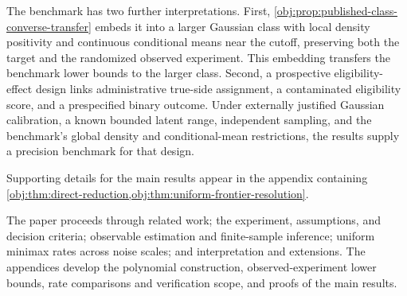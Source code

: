 The benchmark has two further interpretations. First, \cref{obj:prop:published-class-converse-transfer} embeds it into a larger Gaussian class with local density positivity and continuous conditional means near the cutoff, preserving both the target and the randomized observed experiment. This embedding transfers the benchmark lower bounds to the larger class. Second, a prospective eligibility-effect design links administrative true-side assignment, a contaminated eligibility score, and a prespecified binary outcome. Under externally justified Gaussian calibration, a known bounded latent range, independent sampling, and the benchmark's global density and conditional-mean restrictions, the results supply a precision benchmark for that design.

Supporting details for the main results appear in the appendix containing \cref{obj:thm:direct-reduction,obj:thm:uniform-frontier-resolution}.

The paper proceeds through related work; the experiment, assumptions, and decision criteria; observable estimation and finite-sample inference; uniform minimax rates across noise scales; and interpretation and extensions. The appendices develop the polynomial construction, observed-experiment lower bounds, rate comparisons and verification scope, and proofs of the main results.
